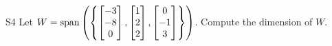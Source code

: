 \documentclass{sbgLAexam}
\begin{document}
\begin{problem}{S4}
Let $W = {\rm span} \left( \left\{  \begin{bmatrix} -3 \\ -8 \\ 0 \end{bmatrix}, \begin{bmatrix} 1 \\ 2 \\ 2 \end{bmatrix}, \begin{bmatrix} 0 \\ -1 \\ 3 \end{bmatrix} \right\} \right)$.  Compute the dimension of $W$.
\end{problem}
\end{document}

